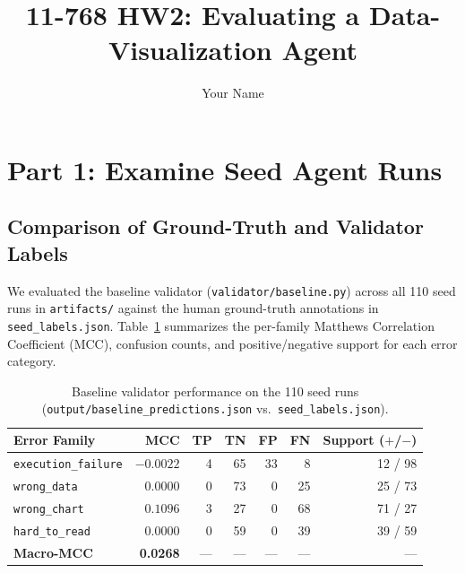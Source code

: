 \documentclass[11pt]{article}
\title{11-768 HW2: Evaluating a Data-Visualization Agent}
\author{Your Name}
\date{}
\begin{document}
\maketitle

\section{Part 1: Examine Seed Agent Runs}

\subsection{Comparison of Ground-Truth and Validator Labels}
We evaluated the baseline validator (\texttt{validator/baseline.py}) across all 110 seed runs in \texttt{artifacts/} against the human ground-truth annotations in \texttt{seed\_labels.json}. Table~\ref{tab:part1-baseline} summarizes the per-family Matthews Correlation Coefficient (MCC), confusion counts, and positive/negative support for each error category.

\begin{table}[h]
\centering
\caption{Baseline validator performance on the 110 seed runs (\texttt{output/baseline\_predictions.json} vs.\ \texttt{seed\_labels.json}).}
\label{tab:part1-baseline}
\begin{tabular}{lrrrrrr}
\toprule
Error Family & MCC & TP & TN & FP & FN & Support ($+$/$-$) \\
\midrule
\texttt{execution\_failure} & $-0.0022$ & 4 & 65 & 33 & 8 & 12 / 98 \\
\texttt{wrong\_data}        & $0.0000$  & 0 & 73 & 0  & 25 & 25 / 73 \\
\texttt{wrong\_chart}       & $0.1096$  & 3 & 27 & 0  & 68 & 71 / 27 \\
\texttt{hard\_to\_read}     & $0.0000$  & 0 & 59 & 0  & 39 & 39 / 59 \\
\midrule
\textbf{Macro-MCC}          & \textbf{0.0268} & --- & --- & --- & --- & --- \\
\bottomrule
\end{tabular}
\end{table}
\end{document}
